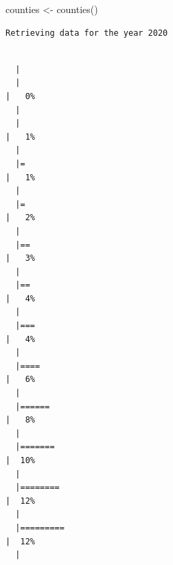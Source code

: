 \documentclass[
  letterpaper,
  DIV=11,
  numbers=noendperiod]{scrreprt}
\newenvironment{Shaded}{\begin{snugshade}}{\end{snugshade}}
\newcommand{\FunctionTok}[1]{\textcolor[rgb]{0.28,0.35,0.67}{#1}}
\newcommand{\NormalTok}[1]{\textcolor[rgb]{0.00,0.23,0.31}{#1}}
\newcommand{\OtherTok}[1]{\textcolor[rgb]{0.00,0.23,0.31}{#1}}
\begin{document}
\begin{Shaded}
\begin{Highlighting}[]
\NormalTok{counties }\OtherTok{\textless{}{-}} \FunctionTok{counties}\NormalTok{()}
\end{Highlighting}
\end{Shaded}

\begin{verbatim}
Retrieving data for the year 2020
\end{verbatim}

\begin{verbatim}

  |                                                                            
  |                                                                      |   0%
  |                                                                            
  |                                                                      |   1%
  |                                                                            
  |=                                                                     |   1%
  |                                                                            
  |=                                                                     |   2%
  |                                                                            
  |==                                                                    |   3%
  |                                                                            
  |==                                                                    |   4%
  |                                                                            
  |===                                                                   |   4%
  |                                                                            
  |====                                                                  |   6%
  |                                                                            
  |======                                                                |   8%
  |                                                                            
  |=======                                                               |  10%
  |                                                                            
  |========                                                              |  12%
  |                                                                            
  |=========                                                             |  12%
  |                                                                            

\end{verbatim}
\end{document}
